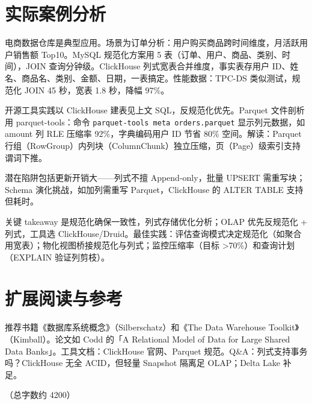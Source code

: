 \chapter{实际案例分析}
电商数据仓库是典型应用。场景为订单分析：用户购买商品跨时间维度，月活跃用户销售额 Top10。MySQL 规范化方案用 5 表（订单、用户、商品、类别、时间），JOIN 查询分钟级。ClickHouse 列式宽表合并维度，事实表存用户 ID、姓名、商品名、类别、金额、日期，一表搞定。性能数据：TPC-DS 类似测试，规范化 JOIN 45 秒，宽表 1.8 秒，降幅 97\%{}。\par
开源工具实践以 ClickHouse 建表见上文 SQL，反规范化优先。Parquet 文件剖析用 parquet-tools：命令 \texttt{parquet-tools meta orders.parquet} 显示列元数据，如 amount 列 RLE 压缩率 92\%{}，字典编码用户 ID 节省 80\%{} 空间。解读：Parquet 行组（RowGroup）内列块（ColumnChunk）独立压缩，页（Page）级索引支持谓词下推。\par
潜在陷阱包括更新开销大——列式不擅 Append-only，批量 UPSERT 需重写块；Schema 演化挑战，如加列需重写 Parquet，ClickHouse 的 ALTER TABLE 支持但耗时。\par
关键 takeaway 是规范化确保一致性，列式存储优化分析；OLAP 优先反规范化 + 列式，工具选 ClickHouse/Druid。最佳实践：评估查询模式决定规范化（如聚合用宽表）；物化视图桥接规范化与列式；监控压缩率（目标 >70\%{}）和查询计划（EXPLAIN 验证列剪枝）。\par
\chapter{扩展阅读与参考}
推荐书籍《数据库系统概念》（Silberschatz）和《The Data Warehouse Toolkit》（Kimball）。论文如 Codd 的「A Relational Model of Data for Large Shared Data Banks」。工具文档：ClickHouse 官网、Parquet 规范。Q\&{}A：列式支持事务吗？ClickHouse 无全 ACID，但轻量 Snapshot 隔离足 OLAP；Delta Lake 补足。\par
（总字数约 4200）\par
